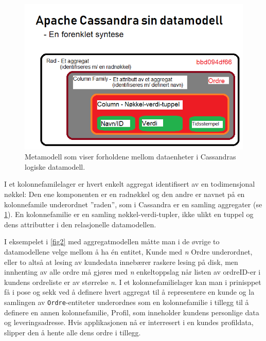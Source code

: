 \newpage

\begin{figure}[!ht]
    \centering
    \includegraphics[scale=0.7]{fig/kolonneorientert.png}
    \caption{Metamodell som viser forholdene mellom dataenheter i Cassandras logiske datamodell.}
    \label{fig3}
\end{figure}

I et kolonnefamilelager er hvert enkelt aggregat identifisert av en todimensjonal nøkkel: Den ene komponenten er en radnøkkel og den andre er navnet på en kolonnefamile underordnet ''raden'', som i Cassandra er en samling aggregater (se \ref{fig3}). En kolonnefamilie er en samling nøkkel-verdi-tupler, ikke ulikt en tuppel og dens attributter i den relasjonelle datamodellen.

I eksempelet i \ref{fig2} med aggregatmodellen måtte man i de øvrige to datamodellene velge mellom å ha én entitet, Kunde med \emph{n} Ordre underordnet, eller to altså at lesing av kundedata innebærer raskere lesing på disk, men innhenting av alle ordre må gjøres med \emph{n} enkeltoppslag når listen av ordreID-er i kundens ordreliste er av størrelse \emph{n}. I et kolonnefamilielager kan man i prinisppet få i pose og sekk ved å definere hvert aggregat til å representere en kunde og la samlingen av \texttt{Ordre}-entiteter underordnes som en kolonnefamilie i tillegg til å definere en annen kolonnefamilie, Profil, som inneholder kundens personlige data og leveringsadresse. Hvis applikasjonen nå er interresert i en kundes profildata, slipper den å hente alle dens ordre i tillegg.
